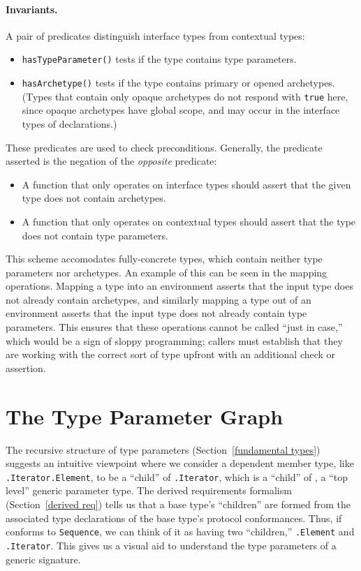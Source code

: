 \documentclass[../generics]{subfiles}
\begin{document}
\paragraph{Invariants.} A pair of predicates distinguish interface types from contextual types:
\begin{itemize}
\item \texttt{hasTypeParameter()} tests if the type contains type parameters.
\item \texttt{hasArchetype()} tests if the type contains primary or opened archetypes. (Types that contain only opaque archetypes do not respond with \texttt{true} here, since opaque archetypes have global scope, and may occur in the interface types of declarations.)
\end{itemize}
These predicates are used to check preconditions. Generally, the predicate asserted is the negation of the \emph{opposite} predicate:
\begin{itemize}
\item A function that only operates on interface types should assert that the given type does not contain archetypes.
\item A function that only operates on contextual types should assert that the type does not contain type parameters.
\end{itemize}
This scheme accomodates fully-concrete types, which contain neither type parameters nor archetypes. An example of this can be seen in the mapping operations. Mapping a type into an environment asserts that the input type does not already contain archetypes, and similarly mapping a type out of an environment asserts that the input type does not already contain type parameters. This ensures that these operations cannot be called ``just in case,'' which would be a sign of sloppy programming; callers must establish that they are working with the correct sort of type upfront with an additional check or assertion.

\section{The Type Parameter Graph}\label{type parameter graph}

The recursive structure of type parameters (Section~\ref{fundamental types}) suggests an intuitive viewpoint where we consider a dependent member type, like \texttt{.Iterator.Element}, to be a ``child'' of \texttt{.Iterator}, which is a ``child'' of , a ``top level'' generic parameter type. The derived requirements formalism (Section~\ref{derived req}) tells us that a base type's ``children'' are formed from the associated type declarations of the base type's protocol conformances. Thus, if  conforms to \texttt{Sequence}, we can think of it as having two ``children,'' \texttt{.Element} and \texttt{.Iterator}. This gives us a visual aid to understand the type parameters of a generic signature.
\end{document}
